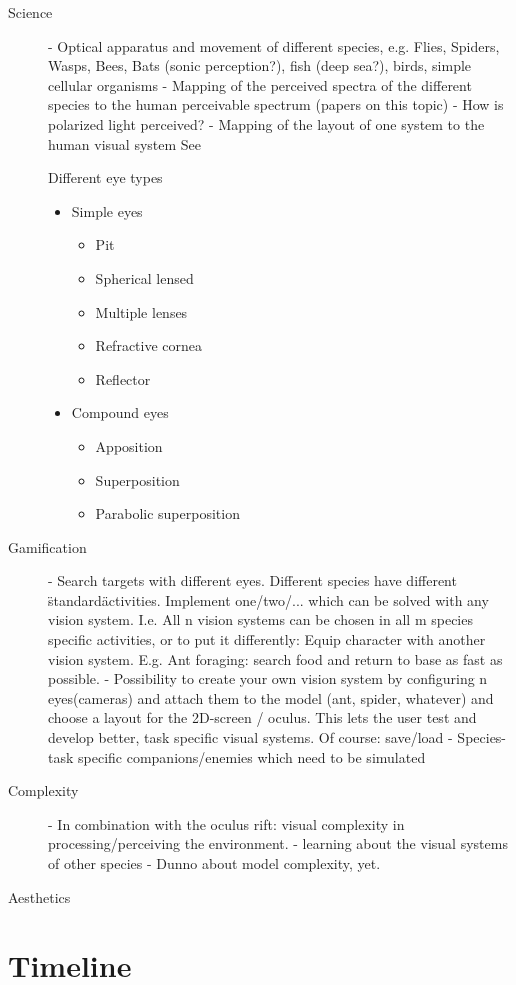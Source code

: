 \documentclass{acm_proc_article-sp}
\begin{document}
\begin{description}
\item[Science]
- Optical apparatus and movement of different species, e.g.
    Flies, Spiders, Wasps, Bees, Bats (sonic perception?),
    fish (deep sea?), birds, simple cellular organisms
- Mapping of the perceived spectra of the different species to the human
  perceivable spectrum (papers on this topic)
- How is polarized light perceived?
- Mapping of the layout of one system to the human visual system
See \cite{insectvision}

Different eye types
\begin{itemize}
  \item Simple eyes
  \begin{itemize}
    \item Pit
    \item Spherical lensed
    \item Multiple lenses
    \item Refractive cornea
    \item Reflector
  \end{itemize}
  \item Compound eyes
  \begin{itemize}
    \item Apposition
    \item Superposition
    \item Parabolic superposition
  \end{itemize}
\end{itemize}

\item[Gamification]
- Search targets with different eyes. Different species have different
  \"standard\" activities.
  Implement one/two/... which can be solved with any vision system.
  I.e. All n vision systems can be chosen in all m species specific activities,
  or to put it differently: Equip character with another vision system.
  E.g. Ant foraging: search food and return to base as fast as possible.
- Possibility to create your own vision system by configuring n eyes(cameras)
  and attach them to the model (ant, spider, whatever) and choose a layout
  for the 2D-screen / oculus.
  This lets the user test and develop better, task specific visual systems.
  Of course: save/load
- Species-task specific companions/enemies which need to be simulated

\item[Complexity]
- In combination with the oculus rift: visual complexity in
  processing/perceiving the environment.
- learning about the visual systems of other species
- Dunno about model complexity, yet.

\item[Aesthetics]
\end{description}

\section{Timeline}

\printbibliography
\end{document}
